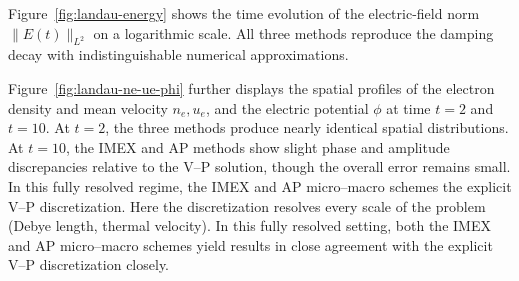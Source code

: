 \documentclass[pdflatex,final,10pt]{article}
\newcommand{\Fabrice}[1]{#1}
\begin{document}
Figure~\ref{fig:landau-energy} shows the time evolution of the electric-field norm $\|E(t)\|_{L^2}$ on a logarithmic scale. All three methods reproduce \Fabrice{the damping decay with indistinguishable numerical approximations.}


\Fabrice{Figure~\ref{fig:landau-ne-ue-phi} further displays the spatial profiles of the electron density and mean velocity $n_e,u_e$, and the electric potential $\phi$ at time $t=2 $ and $t=10$.}  At $t=2$, the three methods produce nearly identical spatial distributions. \Fabrice{At $t=10$, the IMEX and AP methods show slight phase and amplitude discrepancies relative to the V--P solution, though the overall error remains small. In this fully resolved regime, the IMEX and AP micro--macro schemes the explicit V--P discretization. Here the discretization resolves every scale of the problem (Debye length, thermal velocity). In this fully resolved setting, both the IMEX and AP micro--macro schemes yield results in close agreement with  the explicit V--P discretization closely.}
\end{document}
